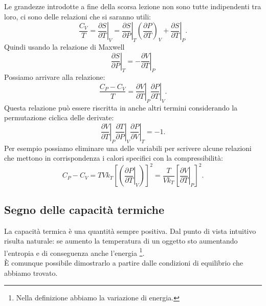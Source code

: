Le grandezze introdotte a fine della scorsa lezione non sono tutte indipendenti tra loro, ci sono delle relazioni che si saranno utili:
\[
	\frac{C_{V}}{T}= \left.\frac{\partial S}{\partial T} \right|_{V}= \left.\frac{\partial S}{\partial P} \right|_{T} \left( \frac{\partial P}{\partial T}  \right) _{V} + \left.\frac{\partial S}{\partial T} \right|_{P}
.\] 
Quindi usando la relazione di Maxwell
\[
	\left.\frac{\partial S}{\partial P} \right|_{T}= - \left.\frac{\partial V}{\partial T} \right|_{P}
\]
Possiamo arrivare alla relazione:
\[
	 \frac{C_{P}- C_{V}}{T}= \left.\frac{\partial V}{\partial T} \right|_{P} \left.\frac{\partial P}{\partial T} \right|_{V}
.\] 
Questa relazione può essere riscritta in anche altri termini considerando la permutazione ciclica delle derivate:
\[
	\left.\frac{\partial V}{\partial T} \right|_{P} \left.\frac{\partial T}{\partial P} \right|_{V} \left.\frac{\partial P}{\partial V} \right|_{T} = -1
.\] 
Per esempio possiamo eliminare una delle variabili per scrivere alcune relazioni che mettono in corrispondenza i calori specifici con la compressibilità:
\[
	C_{P}- C_{V}= TVk_{T} \left[ \left( \left.\frac{\partial P}{\partial T} \right|_{V} \right)  \right] ^2 
		= \frac{T}{V k_{T}} \left[ \left.\frac{\partial V}{\partial T} \right|_{P} \right]^2
.\]
\subsection{Segno delle capacità termiche}%
La capacità termica è una quantità sempre positiva. Dal punto di vista intuitivo risulta naturale: se aumento la temperatura di un oggetto sto aumentando l'entropia e di conseguenza anche l'energia \footnote{Nella definizione abbiamo la variazione di energia.}.\\
È comunque possibile dimostrarlo a partire dalle condizioni di equilibrio che abbiamo trovato. 
